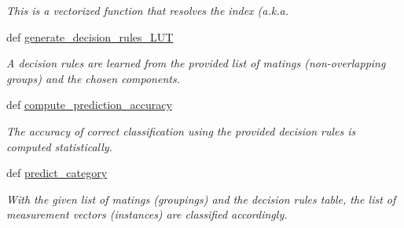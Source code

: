 \begin{DoxyCompactItemize}
\begin{DoxyCompactList}\small\item\em This is a vectorized function that resolves the index (a.\+k.\+a. \end{DoxyCompactList}\item 
def \hyperlink{classmate__learning_1_1_mate_finder_a6f3887d912b4f87eb612b6e67b38b8fd}{generate\+\_\+decision\+\_\+rules\+\_\+\+L\+U\+T}
\begin{DoxyCompactList}\small\item\em A decision rules are learned from the provided list of matings (non-\/overlapping groups) and the chosen components. \end{DoxyCompactList}\item 
def \hyperlink{classmate__learning_1_1_mate_finder_a79a1cb24bc6df0d732abd48b4ad0a63f}{compute\+\_\+prediction\+\_\+accuracy}
\begin{DoxyCompactList}\small\item\em The accuracy of correct classification using the provided decision rules is computed statistically. \end{DoxyCompactList}\item 
def \hyperlink{classmate__learning_1_1_mate_finder_aff6680733a2803e2e39f860fa63a0fd8}{predict\+\_\+category}
\begin{DoxyCompactList}\small\item\em With the given list of matings (groupings) and the decision rules table, the list of measurement vectors (instances) are classified accordingly. \end{DoxyCompactList}\end{DoxyCompactItemize}
